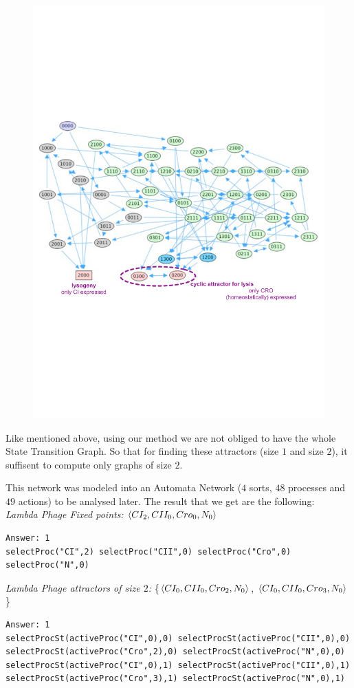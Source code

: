 \begin{figure}[h]
   \includegraphics{figures/lampdaphage-STG.pdf}
\end{figure}

Like mentioned above, using our method we are not obliged to have the whole State Transition Graph. So that for finding these attractors (size $1$ and size $2$), it suffisent to compute only graphs of size $2$. 

This network was modeled into an Automata Network ($4$ sorts, $48$ processes and $49$ actions) to be analysed later. The result that we get are the following: \\
\textit{ Lambda Phage Fixed points:} $\mbox{$\langle CI_2, CII_0, Cro_0, N_0 \rangle$}$
\begin{lstlisting}[numbers=none]
Answer: 1
selectProc("CI",2) selectProc("CII",0) selectProc("Cro",0) selectProc("N",0)
\end{lstlisting}
\textit{Lambda Phage attractors of size $2$:} \{$\mbox{$\langle CI_0, CII_0, Cro_2, N_0 \rangle$}$, $\mbox{$\langle CI_0, CII_0, Cro_3, N_0 \rangle$}$ \}
\begin{lstlisting}[numbers=none]
Answer: 1
selectProcSt(activeProc("CI",0),0) selectProcSt(activeProc("CII",0),0)
selectProcSt(activeProc("Cro",2),0) selectProcSt(activeProc("N",0),0) 
selectProcSt(activeProc("CI",0),1) selectProcSt(activeProc("CII",0),1)
selectProcSt(activeProc("Cro",3),1) selectProcSt(activeProc("N",0),1)
 \end{lstlisting}


